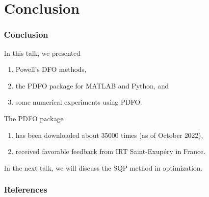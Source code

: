 \documentclass{polyu-presentation}
\begin{document}
\section{Conclusion}

\begin{frame}
    \frametitle{Conclusion}
    
    In this talk, we presented
    \begin{enumerate}
        \item \alert{Powell's DFO methods},
        \item the \alert{PDFO} package for MATLAB and Python, and
        \item some \alert{numerical experiments} using PDFO.
    \end{enumerate}

    \bigskip

    The PDFO package
    \begin{enumerate}
        \item has been \alert{downloaded} about \num{35000} times (as of October 2022),
        \item received \alert{favorable feedback} from IRT Saint-Exup{\'{e}}ry in France.
    \end{enumerate}

    \bigskip

    In the next talk, we will discuss the \alert{SQP method} in optimization.
\end{frame}

\appendix

\begin{frame}[t,allowframebreaks]
    \frametitle{References}

	\printbibliography
\end{frame}
\end{document}
